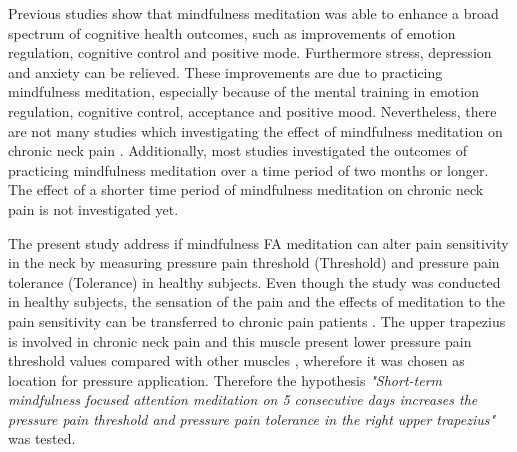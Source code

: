 Previous studies show that mindfulness meditation was able to enhance a broad spectrum of cognitive health outcomes, such as improvements of emotion regulation, cognitive control and positive mode. Furthermore stress, depression and anxiety can be relieved. These improvements are due to practicing mindfulness meditation, especially because of the mental training in emotion regulation, cognitive control, acceptance and positive mood. \cite{marcus2009,Zeidan2012, Zeidan2016} Nevertheless, there are not many studies which investigating the effect of mindfulness meditation on chronic neck pain \cite{Macfarlanea2016}. Additionally, most studies investigated the outcomes of practicing mindfulness meditation over a time period of two months or longer. The effect of a shorter time period of mindfulness meditation on chronic neck pain is not investigated yet. 


The present study address if mindfulness FA meditation can alter pain sensitivity in the neck by measuring pressure pain threshold (Threshold) and pressure pain tolerance (Tolerance) in healthy subjects. Even though the study was conducted in healthy subjects, the sensation of the pain and the effects of meditation to the pain sensitivity can be transferred to chronic pain patients \cite{Kjogx2016}. The upper trapezius is involved in chronic neck pain and this muscle present lower pressure pain threshold values compared with other muscles \cite{Fischer1987, Falla2004}, wherefore it was chosen as location for pressure application.
Therefore the hypothesis \textit{"Short-term mindfulness focused attention meditation on 5 consecutive days increases the pressure pain threshold and pressure pain tolerance in the right upper trapezius"} was tested.

